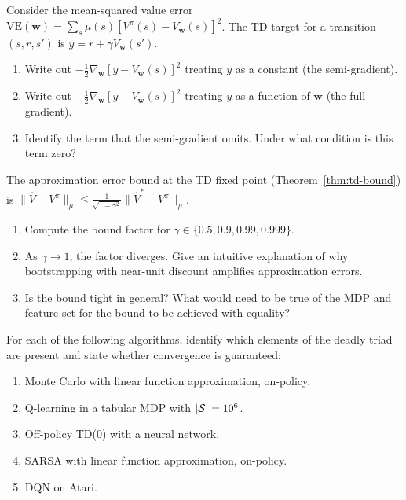 \begin{exercise}
\label{ex:semi-gradient-not-gradient}
Consider the mean-squared value error $\overline{\mathrm{VE}}(\mathbf{w}) = \sum_s \mu(s)[V^\pi(s)
- V_\mathbf{w}(s)]^2$.  The TD target for a transition $(s, r, s')$ is
$y = r + \gamma V_\mathbf{w}(s')$.
\begin{enumerate}
\item Write out $-\frac{1}{2}\nabla_\mathbf{w}[y - V_\mathbf{w}(s)]^2$ treating $y$ as a
  constant (the semi-gradient).
\item Write out $-\frac{1}{2}\nabla_\mathbf{w}[y - V_\mathbf{w}(s)]^2$ treating $y$ as a
  function of $\mathbf{w}$ (the full gradient).
\item Identify the term that the semi-gradient omits.  Under what condition is this term zero?
\end{enumerate}
\end{exercise}

\begin{exercise}
\label{ex:td-bound}
The approximation error bound at the TD fixed point (Theorem~\ref{thm:td-bound}) is
$\|\hat{V} - V^\pi\|_\mu \leq \frac{1}{\sqrt{1-\gamma^2}}\|\hat{V}^* - V^\pi\|_\mu$.
\begin{enumerate}
\item Compute the bound factor for $\gamma \in \{0.5, 0.9, 0.99, 0.999\}$.
\item As $\gamma \to 1$, the factor diverges.  Give an intuitive explanation of why bootstrapping
  with near-unit discount amplifies approximation errors.
\item Is the bound tight in general?  What would need to be true of the MDP and feature set for the
  bound to be achieved with equality?
\end{enumerate}
\end{exercise}

\begin{exercise}
\label{ex:deadly-triad-identify}
For each of the following algorithms, identify which elements of the deadly triad are present and
state whether convergence is guaranteed:
\begin{enumerate}
\item Monte Carlo with linear function approximation, on-policy.
\item Q-learning in a tabular MDP with $|\mathcal{S}| = 10^6$.
\item Off-policy TD(0) with a neural network.
\item SARSA with linear function approximation, on-policy.
\item DQN on Atari.
\end{enumerate}
\end{exercise}

